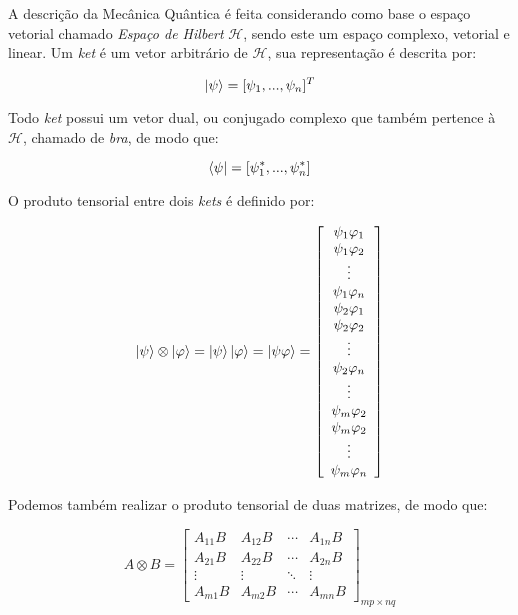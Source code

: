A descrição da Mecânica Quântica é feita considerando como base o espaço vetorial chamado \textit{Espaço de Hilbert} $\mathcal{H}$, sendo este um espaço complexo, vetorial e linear. Um \textit{ket} é um vetor arbitrário de $\mathcal{H}$, sua representação é descrita por:

\begin{equation}\label{eq:ketpsi}
\ket{\psi} = [\psi_1,...,\psi_n]^T
\end{equation}

Todo \textit{ket} possui um vetor dual, ou conjugado complexo que também pertence à $\mathcal{H}$, chamado de \textit{bra}, de modo que:

\begin{equation}\label{eq:brapsi}
\bra{\psi} = [\psi_1^*,...,\psi_n^*]
\end{equation}

O produto tensorial entre dois \textit{kets} é definido por:

\begin{equation}\label{eq:tensorket}
\ket{\psi} \otimes \ket{\varphi} = \ket{\psi}\ket{\varphi} =\ket{\psi \varphi} =\left[\begin{array}{c}\psi_1 \varphi_1 \\ \psi_1 \varphi_2 \\ \vdots \\ \psi_1 \varphi_n \\ \psi_2 \varphi_1 \\ \psi_2 \varphi_2 \\ \vdots \\ \psi_2 \varphi_n \\ \vdots \\ \psi_m \varphi_2 \\ \psi_m \varphi_2 \\ \vdots \\ \psi_m \varphi_n\end{array}\right]
\end{equation}

Podemos também realizar o produto tensorial de duas matrizes, de modo que:

\begin{equation}\label{eq:tensormatrix}
A \otimes B=\left[\begin{array}{cccc}
A_{11} B & A_{12} B & \cdots & A_{1 n} B \\
A_{21} B & A_{22} B & \cdots & A_{2 n} B \\
\vdots & \vdots & \ddots & \vdots \\
A_{m 1} B & A_{m 2} B & \cdots & A_{m n} B
\end{array}\right]_{m p \times n q}
\end{equation}

